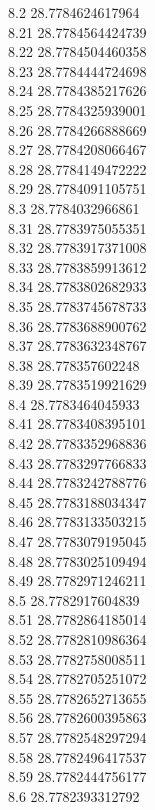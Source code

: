 {8.2	28.7784624617964\\
8.21	28.7784564424739\\
8.22	28.7784504460358\\
8.23	28.7784444724698\\
8.24	28.7784385217626\\
8.25	28.7784325939001\\
8.26	28.7784266888669\\
8.27	28.7784208066467\\
8.28	28.7784149472222\\
8.29	28.7784091105751\\
8.3	28.7784032966861\\
8.31	28.7783975055351\\
8.32	28.7783917371008\\
8.33	28.7783859913612\\
8.34	28.7783802682933\\
8.35	28.7783745678733\\
8.36	28.7783688900762\\
8.37	28.7783632348767\\
8.38	28.778357602248\\
8.39	28.7783519921629\\
8.4	28.7783464045933\\
8.41	28.7783408395101\\
8.42	28.7783352968836\\
8.43	28.7783297766833\\
8.44	28.7783242788776\\
8.45	28.7783188034347\\
8.46	28.7783133503215\\
8.47	28.7783079195045\\
8.48	28.7783025109494\\
8.49	28.7782971246211\\
8.5	28.7782917604839\\
8.51	28.7782864185014\\
8.52	28.7782810986364\\
8.53	28.7782758008511\\
8.54	28.7782705251072\\
8.55	28.7782652713655\\
8.56	28.7782600395863\\
8.57	28.7782548297294\\
8.58	28.7782496417537\\
8.59	28.7782444756177\\
8.6	28.7782393312792\\
}
